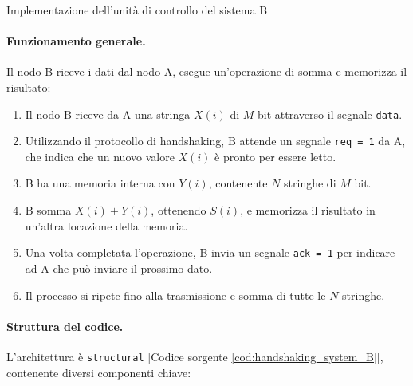 \begin{code}
    \inputminted{vhdl}{vhdl/handshaking_control_unit_B.vhd}
    \caption{Implementazione dell'unità di controllo del sistema B}
    \label{cod:handshaking_control_unit_B}
\end{code}

\paragraph{Funzionamento generale.}
Il nodo B riceve i dati dal nodo A, esegue un'operazione di somma e memorizza il risultato:

\begin{enumerate}
    \item Il nodo B riceve da A una stringa $X(i)$ di $M$ bit attraverso il segnale \texttt{data}.
    \item Utilizzando il protocollo di handshaking, B attende un segnale \texttt{req = 1} da A, che indica che un nuovo valore $X(i)$ è pronto per essere letto.
    \item B ha una memoria interna con $Y(i)$, contenente $N$ stringhe di $M$ bit.
    \item B somma $X(i) + Y(i)$, ottenendo $S(i)$, e memorizza il risultato in un'altra locazione della memoria.
    \item Una volta completata l'operazione, B invia un segnale \texttt{ack = 1} per indicare ad A che può inviare il prossimo dato.
    \item Il processo si ripete fino alla trasmissione e somma di tutte le $N$ stringhe.
\end{enumerate}

\paragraph{Struttura del codice.}
L’architettura è \texttt{structural} [Codice sorgente \ref{cod:handshaking_system_B}], contenente diversi componenti chiave:

